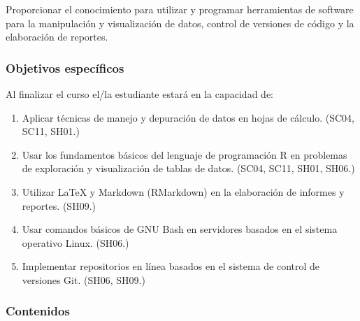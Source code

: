 \begin{refsection}
Proporcionar el conocimiento para utilizar y programar herramientas de software para la manipulación y visualización de datos, control de versiones de código y la elaboración de reportes.

\subsubsection*{Objetivos específicos}

Al finalizar el curso el/la estudiante estará en la capacidad de:

\begin{enumerate}
\item Aplicar técnicas de manejo y depuración de datos en hojas de cálculo. (SC04, SC11, SH01.)
\item Usar los fundamentos básicos del lenguaje de programación R en problemas de exploración y visualización de tablas de datos. (SC04, SC11, SH01, SH06.)
\item Utilizar \LaTeX{} y Markdown (RMarkdown) en la elaboración de informes y reportes. (SH09.)
\item Usar comandos básicos de GNU Bash en servidores basados en el sistema operativo Linux. (SH06.)
\item Implementar repositorios en línea basados en el sistema de control de versiones Git. (SH06, SH09.)
\end{enumerate}

\subsubsection*{Contenidos}


\end{refsection}
